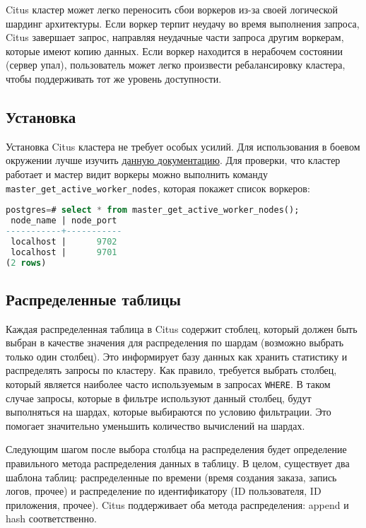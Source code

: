 Citus кластер может легко переносить сбои воркеров из-за своей логической шардинг архитектуры. Если воркер терпит неудачу во время выполнения запроса, Citus завершает запрос, направляя неудачные части запроса другим воркерам, которые имеют копию данных. Если воркер находится в нерабочем состоянии (сервер упал), пользователь может легко произвести ребалансировку кластера, чтобы поддерживать тот же уровень доступности.


\subsection{Установка}

Установка Citus кластера не требует особых усилий. Для использования в боевом окружении лучше изучить \href{https://docs.citusdata.com/en/latest/installation/production.html}{данную документацию}. Для проверки, что кластер работает и мастер видит воркеры можно выполнить команду \lstinline!master_get_active_worker_nodes!, которая покажет список воркеров:

\begin{lstlisting}[language=SQL,label=lst:citus1,caption=Список воркеров]
postgres=# select * from master_get_active_worker_nodes();
 node_name | node_port
-----------+-----------
 localhost |      9702
 localhost |      9701
(2 rows)
\end{lstlisting}


\subsection{Распределенные таблицы}

Каждая распределенная таблица в Citus содержит стоблец, который должен быть выбран в качестве значения для распределения по шардам (возможно выбрать только один столбец). Это информирует базу данных как хранить статистику и распределять запросы по кластеру. Как правило, требуется выбрать столбец, который является наиболее часто используемым в запросах \lstinline!WHERE!. В таком случае запросы, которые в фильтре используют данный столбец, будут выполняться на шардах, которые выбираются по условию фильтрации. Это помогает значительно уменьшить количество вычислений на шардах.

Следующим шагом после выбора столбца на распределения будет определение правильного метода распределения данных в таблицу. В целом, существует два шаблона таблиц: распределенные по времени (время создания заказа, запись логов, прочее) и распределение по идентификатору (ID пользователя, ID приложения, прочее). Citus поддерживает оба метода распределения: append и hash соответственно.

